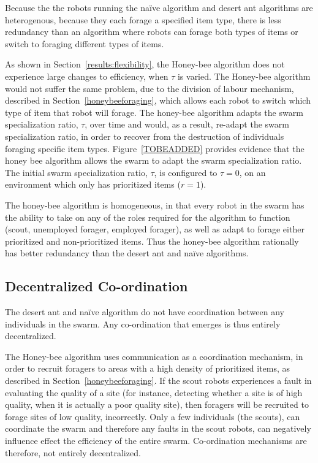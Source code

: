 Because the the robots running the na\"ive algorithm and desert ant algorithms are heterogenous, because they each forage a specified item type, there is less redundancy than an algorithm where robots can forage both types of items or switch to foraging different types of items.

As shown in Section~\ref{results:flexibility}, the Honey-bee algorithm does not experience large changes to efficiency, when $\tau$ is varied. The Honey-bee algorithm would not suffer the same problem, due to the division of labour mechanism, described in Section~\ref{honeybeeforaging}, which allows each robot to switch which type of item that robot will forage. The honey-bee algorithm adapts the swarm specialization ratio, $\tau$, over time and would, as a result, re-adapt the swarm specialization ratio, in order to recover from the destruction of individuals foraging specific item types. Figure~\ref{TOBEADDED} provides evidence that the honey bee algorithm allows the swarm to adapt the swarm specialization ratio. The initial swarm specialization ratio, $\tau$, is configured to $\tau=0$, on an environment which only has prioritized items ($r=1$). 


The honey-bee algorithm is homogeneous, in that every robot in the swarm has the ability to take on any of the roles required for the algorithm to function (scout, unemployed forager, employed forager), as well as adapt to forage either prioritized and non-prioritized items. Thus the honey-bee algorithm rationally has better redundancy than the desert ant and na\"ive algorithms.

\subsection{Decentralized Co-ordination}
\label{results:decentralizedcoordination}


The desert ant and na\"ive algorithm do not have coordination between any individuals in the swarm. Any co-ordination that emerges is thus entirely decentralized. 

The Honey-bee algorithm uses communication as a coordination mechanism, in order to recruit foragers to areas with a high density of prioritized items, as described in Section~\ref{honeybeeforaging}. If the scout robots experiences a fault in evaluating the quality of a site (for instance, detecting whether a site is of high quality, when it is actually a poor quality site), then foragers will be recruited to forage sites of low quality, incorrectly. Only a few individuals (the scouts), can coordinate the swarm and therefore any faults in the scout robots, can negatively influence effect the efficiency of the entire swarm. Co-ordination mechanisms are therefore, not entirely decentralized.

